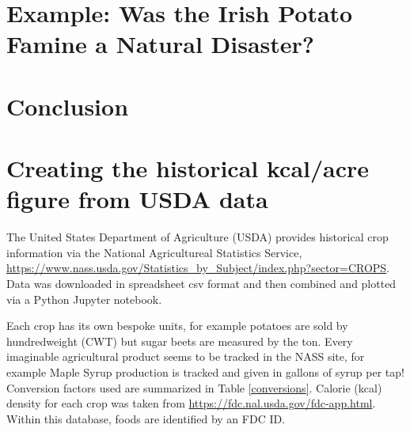 \documentclass[12pt]{iopart}
\begin{document}
\section{Example: Was the Irish Potato Famine a Natural Disaster?}

\section{Conclusion}



\clearpage
\appendix
\section{Creating the historical kcal/acre figure from USDA data}
\label{how_yield_plot_is_made}
The United States Department of Agriculture (USDA) provides historical crop information via the National Agricultureal Statistics Service, \url{https://www.nass.usda.gov/Statistics_by_Subject/index.php?sector=CROPS}.  Data was downloaded in spreadsheet csv format and then combined and plotted via a Python Jupyter notebook.   

Each crop has its own bespoke units, for example potatoes are sold by hundredweight (CWT) but sugar beets are measured by the ton.  
Every imaginable agricultural product seems to be tracked in the NASS site, for example Maple Syrup production is tracked and given in gallons of syrup per tap! 
Conversion factors used are summarized in Table \ref{conversions}.  
Calorie (kcal) density for each crop was taken from \url{https://fdc.nal.usda.gov/fdc-app.html}.  Within this database, foods are identified by an FDC ID.  
\end{document}
